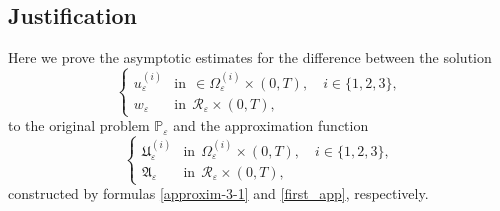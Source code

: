 \documentclass[reqno]{amsart}            %
\numberwithin{equation}{section}
\begin{document}
	
	\subsection{Justification} 
	Here we prove the asymptotic estimates for the difference between the solution 
	\begin{equation*}
		\begin{cases}
			u_\varepsilon^{(i)} & \text{in} \ \ \in\Omega_\varepsilon^{(i)}\times(0,T),\quad i\in\{1,2,3\},\\[3pt]
			w_\varepsilon & \text{in} \ \ \mathcal{R}_\varepsilon\times(0,T),
		\end{cases}
	\end{equation*}	
	to the original problem $\mathbb{P}_\varepsilon$ and the approximation function
	\begin{equation*}
		\begin{cases}
			\mathfrak{U}^{(i)}_\varepsilon & \text{in} \ \ \Omega_\varepsilon^{(i)}\times(0,T),\quad i\in\{1,2,3\},\\[3pt]
			\mathfrak{A}_\varepsilon  & \text{in} \ \ \mathcal{R}_\varepsilon\times(0,T),
		\end{cases}
	\end{equation*}	
	constructed by formulas \eqref{approxim-3-1} and \eqref{first_app}, respectively.
	
	
	
\end{document}
